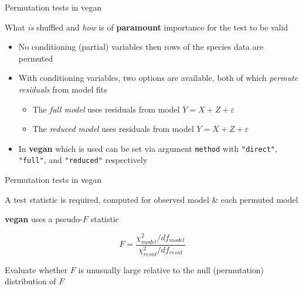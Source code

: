 \documentclass[10pt,ignorenonframetext,compress, aspectratio=169]{beamer}
\begin{document}
\begin{frame}{Permutation tests in vegan}

What \emph{is} shuffled and \emph{how} is of \textbf{paramount}
importance for the test to be valid

\begin{itemize}
\itemsep1pt\parskip0pt
\item
  No conditioning (partial) variables then rows of the species data are
  permuted
\item
  With conditioning variables, two options are available, both of which
  \emph{permute residuals} from model fits

  \begin{itemize}
  \itemsep1pt\parskip0pt
  \item
    The \emph{full model} uses residuals from model
    $Y = X + Z + \varepsilon$
  \item
    The \emph{reduced model} uses residuals from model
    $Y = X + Z + \varepsilon$
  \end{itemize}
\item
  In \textbf{vegan} which is used can be set via argument
  \texttt{method} with \texttt{"direct"}, \texttt{"full"}, and
  \texttt{"reduced"} respectively
\end{itemize}

\end{frame}

\begin{frame}{Permutation tests in vegan}

A test statistic is required, computed for observed model \& each
permuted model

\textbf{vegan} uses a pseudo-$F$ statistic

\[F=\frac{\chi^2_{model} / df_{model}}{\chi^2_{resid} / df_{resid}}\]

Evaluate whether $F$ is unusually large relative to the null
(permutation) distribution of $F$

\end{frame}
\end{document}
